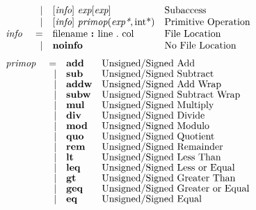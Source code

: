 \documentclass[12pt]{article}
\begin{document}
{\[\begin{array}{rrll}
                &\vert &[\text{\em info}]\  \text{\em exp}[\text{\em exp}]                                                    &\text{Subaccess}\\
                &\vert &[\text{\em info}]\  \text{\em primop}(\text{\em exp*}, \text{int}\text{*})                                 &\text{Primitive Operation}\\
\text{\em info\ }       &=     &\text{filename } \text{\bf :\ } \text{line } . \text{ col}                            &\text{File Location}\\
                &\vert &\text{\bf noinfo\ }                                                                   &\text{No File Location}\\
\end{array}
\]
}
\[
{ \fontsize{10pt}{1.07em}\selectfont
\begin{array}{rrll}
\pd{primop}   &=               &\kws{add}            &\text{Unsigned/Signed Add}\\
              &\vert           &\kws{sub}            &\text{Unsigned/Signed Subtract}\\
              &\vert           &\kws{addw}           &\text{Unsigned/Signed Add Wrap}\\
              &\vert           &\kws{subw}           &\text{Unsigned/Signed Subtract Wrap}\\
              &\vert           &\kws{mul}            &\text{Unsigned/Signed Multiply}\\
              &\vert           &\kws{div}            &\text{Unsigned/Signed Divide}\\
              &\vert           &\kws{mod}            &\text{Unsigned/Signed Modulo}\\
              &\vert           &\kws{quo}            &\text{Unsigned/Signed Quotient}\\
              &\vert           &\kws{rem}            &\text{Unsigned/Signed Remainder}\\
              &\vert           &\kws{lt}             &\text{Unsigned/Signed Less Than}\\
              &\vert           &\kws{leq}            &\text{Unsigned/Signed Less or Equal}\\
              &\vert           &\kws{gt}             &\text{Unsigned/Signed Greater Than}\\
              &\vert           &\kws{geq}            &\text{Unsigned/Signed Greater or Equal}\\
              &\vert           &\kws{eq}             &\text{Unsigned/Signed Equal}\\

\end{array}}\]
\end{document}
